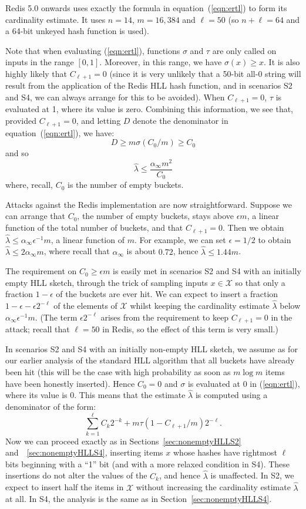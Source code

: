 \documentclass[sigconf, anonymous, dvipsnames]{acmart} %
\begin{document}
Redis 5.0 onwards uses exactly the formula in equation~(\ref{eqn:ertl}) to form its cardinality estimate. It uses $n=14$, $m=16,384$ and $\ell = 50$ (so $n+\ell = 64$ and a 64-bit unkeyed hash function is used). 

Note that when evaluating (\ref{eqn:ertl}), functions $\sigma$ and $\tau$ are only called on inputs in the range $[0,1]$. Moreover, in this range, we have $\sigma(x) \ge x$. It is also highly likely that $C_{\ell+1} = 0$ (since it is very unlikely that a 50-bit all-0 string will result from the application of the Redis HLL hash function, and in scenarios S2 and S4, we can always arrange for this to be avoided). When $C_{\ell+1} = 0$, $\tau$ is evaluated at 1, where its value is zero. Combining this information, we see that, provided $C_{\ell+1} = 0$, and letting $D$ denote the denominator in equation~(\ref{eqn:ertl}), we have:
\[
D \ge m\sigma(C_0/m) \ge C_0
\]
and so
\[
\hat{\lambda}  \leq \frac{\alpha_\infty m^2}{C_0}
\]
where, recall, $C_0$ is the number of empty buckets.

Attacks against the Redis implementation are now straightforward. Suppose we can arrange that $C_0$, the number of empty buckets, stays above ${\epsilon}m$, a linear function of the total number of buckets, and that $C_{\ell+1} = 0$. Then we obtain $\hat{\lambda}  \leq \alpha_\infty \epsilon^{-1} m$, a linear function of $m$. For example, we can set $\epsilon = 1/2$ to obtain $\hat{\lambda}  \leq 2\alpha_\infty m$, where recall that $\alpha_\infty$ is about $0.72$, hence $\hat{\lambda}  \leq 1.44m$.

The requirement on $C_0 \geq {\epsilon}m$ is easily met in scenarios S2 and S4 with an initially empty HLL sketch, through the trick of sampling inputs $x \in {\mathcal{X}}$ so that only a fraction $1-\epsilon$ of the buckets are ever hit. We can expect to insert a fraction $1-\epsilon-\epsilon2^{-\ell}$ of the elements of  ${\mathcal{X}}$ whilst keeping the cardinality estimate $\hat{\lambda}$ below  $\alpha_\infty \epsilon^{-1} m$. (The term $\epsilon2^{-\ell}$ arises from the requirement to keep $C_{\ell+1} =0$ in the attack; recall that $\ell=50$ in Redis, so the effect of this term is very small.) 

In scenarios S2 and S4 with an initially non-empty HLL sketch, we assume as for our earlier analysis of the standard HLL algorithm that all buckets have already been hit (this will be the case with high probability as soon as $m \log m$ items have been honestly inserted). Hence $C_0 = 0$ and $\sigma$ is evaluated at 0 in (\ref{eqn:ertl}), where its value is 0. This means that the estimate $\hat{\lambda}$ is computed using a denominator of the form:
\[
\sum_{k=1}^{\ell}C_k 2^{-k} + m \tau(1-C_{\ell+1}/m)2^{-\ell}.
\]
Now we can proceed exactly as in Sections~\ref{sec:nonemptyHLLS2} and~~\ref{sec:nonemptyHLLS4}, inserting items $x$ whose hashes have rightmost $\ell$ bits beginning with a ``1'' bit (and with a more relaxed condition in S4). These insertions do not alter the values of the $C_k$, and hence $\hat{\lambda}$ is unaffected. In S2, we expect to insert half the items in ${\mathcal{X}}$ without increasing the cardinality estimate $\hat{\lambda}$ at all. In S4, the analysis is the same as in Section~\ref{sec:nonemptyHLLS4}.
\end{document}
